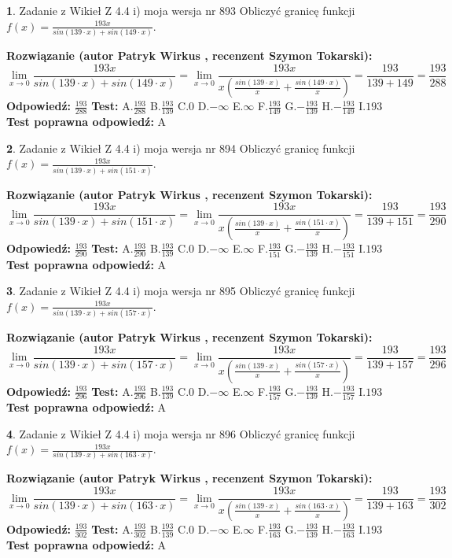 \documentclass[12pt, a4paper]{article}
\theoremstyle{definition} %
\newtheorem{zad}{}
\newcommand{\zadStart}[1]{\begin{zad}#1\newline}
\newcommand{\zadStop}{\end{zad}}
\newcommand{\rozwStart}[2]{\noindent \textbf{Rozwiązanie (autor #1 , recenzent #2): }\newline}
\newcommand{\rozwStop}{\newline}
\newcommand{\odpStart}{\noindent \textbf{Odpowiedź:}\newline}
\newcommand{\odpStop}{\newline}
\newcommand{\testStart}{\noindent \textbf{Test:}\newline}
\newcommand{\testStop}{\newline}
\newcommand{\kluczStart}{\noindent \textbf{Test poprawna odpowiedź:}\newline}
\newcommand{\kluczStop}{\newline}
\begin{document}
\zadStart{Zadanie z Wikieł Z 4.4 i) moja wersja nr 893}
Obliczyć granicę funkcji $f(x)=\frac{193x}{sin(139\cdot x) +sin(149\cdot x)}$.
\zadStop
\rozwStart{Patryk Wirkus}{Szymon Tokarski}
$$\lim\limits_{x\to 0}\frac{193x}{sin(139\cdot x) +sin(149\cdot x)}=\lim\limits_{x\to 0}\frac{193x}{x(\frac{sin(139\cdot x)}{x}+\frac{sin(149\cdot x)}{x})}=\frac{193}{139+149} = \frac{193}{288}$$
\rozwStop
\odpStart
$\frac{193}{288}$
\odpStop
\testStart
A.$\frac{193}{288}$
B.$\frac{193}{139}$
C.$0$
D.$-\infty$
E.$\infty$
F.$\frac{193}{149}$
G.$-\frac{193}{139}$
H.$-\frac{193}{149}$
I.$193$
\testStop
\kluczStart
A
\kluczStop



\zadStart{Zadanie z Wikieł Z 4.4 i) moja wersja nr 894}
Obliczyć granicę funkcji $f(x)=\frac{193x}{sin(139\cdot x) +sin(151\cdot x)}$.
\zadStop
\rozwStart{Patryk Wirkus}{Szymon Tokarski}
$$\lim\limits_{x\to 0}\frac{193x}{sin(139\cdot x) +sin(151\cdot x)}=\lim\limits_{x\to 0}\frac{193x}{x(\frac{sin(139\cdot x)}{x}+\frac{sin(151\cdot x)}{x})}=\frac{193}{139+151} = \frac{193}{290}$$
\rozwStop
\odpStart
$\frac{193}{290}$
\odpStop
\testStart
A.$\frac{193}{290}$
B.$\frac{193}{139}$
C.$0$
D.$-\infty$
E.$\infty$
F.$\frac{193}{151}$
G.$-\frac{193}{139}$
H.$-\frac{193}{151}$
I.$193$
\testStop
\kluczStart
A
\kluczStop



\zadStart{Zadanie z Wikieł Z 4.4 i) moja wersja nr 895}
Obliczyć granicę funkcji $f(x)=\frac{193x}{sin(139\cdot x) +sin(157\cdot x)}$.
\zadStop
\rozwStart{Patryk Wirkus}{Szymon Tokarski}
$$\lim\limits_{x\to 0}\frac{193x}{sin(139\cdot x) +sin(157\cdot x)}=\lim\limits_{x\to 0}\frac{193x}{x(\frac{sin(139\cdot x)}{x}+\frac{sin(157\cdot x)}{x})}=\frac{193}{139+157} = \frac{193}{296}$$
\rozwStop
\odpStart
$\frac{193}{296}$
\odpStop
\testStart
A.$\frac{193}{296}$
B.$\frac{193}{139}$
C.$0$
D.$-\infty$
E.$\infty$
F.$\frac{193}{157}$
G.$-\frac{193}{139}$
H.$-\frac{193}{157}$
I.$193$
\testStop
\kluczStart
A
\kluczStop



\zadStart{Zadanie z Wikieł Z 4.4 i) moja wersja nr 896}
Obliczyć granicę funkcji $f(x)=\frac{193x}{sin(139\cdot x) +sin(163\cdot x)}$.
\zadStop
\rozwStart{Patryk Wirkus}{Szymon Tokarski}
$$\lim\limits_{x\to 0}\frac{193x}{sin(139\cdot x) +sin(163\cdot x)}=\lim\limits_{x\to 0}\frac{193x}{x(\frac{sin(139\cdot x)}{x}+\frac{sin(163\cdot x)}{x})}=\frac{193}{139+163} = \frac{193}{302}$$
\rozwStop
\odpStart
$\frac{193}{302}$
\odpStop
\testStart
A.$\frac{193}{302}$
B.$\frac{193}{139}$
C.$0$
D.$-\infty$
E.$\infty$
F.$\frac{193}{163}$
G.$-\frac{193}{139}$
H.$-\frac{193}{163}$
I.$193$
\testStop
\kluczStart
A
\kluczStop
\end{document}
